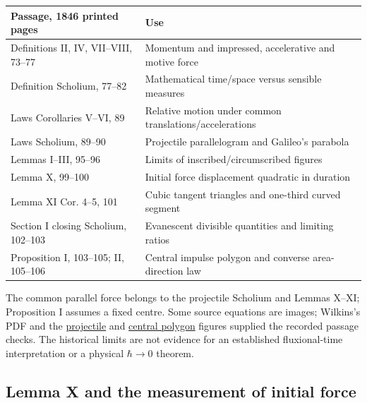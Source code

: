 \documentclass[11pt,a4paper]{article}
\begin{document}
\begin{longtable}[]{@{}
  >{\raggedright\arraybackslash}p{}
  >{\raggedright\arraybackslash}p{}@{}}
\toprule\noalign{}
\begin{minipage}[b]{\linewidth}\raggedright
Passage, 1846 printed pages
\end{minipage} & \begin{minipage}[b]{\linewidth}\raggedright
Use
\end{minipage} \\
\midrule\noalign{}
\endhead
\bottomrule\noalign{}
\endlastfoot
Definitions II, IV, VII--VIII, 73--77 & Momentum and impressed,
accelerative and motive force \\
Definition Scholium, 77--82 & Mathematical time/space versus sensible
measures \\
Laws Corollaries V--VI, 89 & Relative motion under common
translations/accelerations \\
Laws Scholium, 89--90 & Projectile parallelogram and Galileo's
parabola \\
Lemmas I--III, 95--96 & Limits of inscribed/circumscribed figures \\
Lemma X, 99--100 & Initial force displacement quadratic in duration \\
Lemma XI Cor. 4--5, 101 & Cubic tangent triangles and one-third curved
segment \\
Section I closing Scholium, 102--103 & Evanescent divisible quantities
and limiting ratios \\
Proposition I, 103--105; II, 105--106 & Central impulse polygon and
converse area-direction law \\
\end{longtable}

The common parallel force belongs to the projectile Scholium and Lemmas
X--XI; Proposition I assumes a fixed centre. Some source equations are
images; Wilkins's PDF and the
\href{../docs/images/i_090a.jpg}{projectile} and
\href{../docs/images/i_104.jpg}{central polygon} figures supplied the
recorded passage checks. The historical limits are not evidence for an
established fluxional-time interpretation or a physical \(\hbar\to0\)
theorem.

\subsection{Lemma X and the measurement of initial
force}\label{lemma-x-and-the-measurement-of-initial-force}
\end{document}
